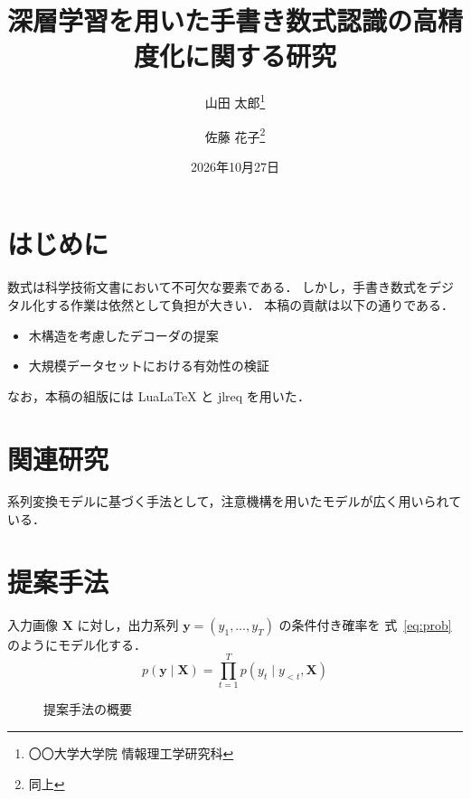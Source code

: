 \documentclass[paper=a4paper,fontsize=10pt,twocolumn]{jlreq}
\title{深層学習を用いた手書き数式認識の高精度化に関する研究}
\author{山田 太郎\thanks{〇〇大学大学院 情報理工学研究科} \and 佐藤 花子\thanks{同上}}
\date{2026年10月27日}
\begin{document}

\section{はじめに}
数式は科学技術文書において不可欠な要素である．
しかし，手書き数式をデジタル化する作業は依然として負担が大きい\cite{zhang2017}．
本稿の貢献は以下の通りである．
\begin{itemize}
  \item 木構造を考慮したデコーダの提案
  \item 大規模データセットにおける有効性の検証
\end{itemize}
なお，本稿の組版には LuaLaTeX と jlreq を用いた\cite{okumura2023}．

\section{関連研究}
系列変換モデルに基づく手法として，注意機構を用いたモデルが広く用いられている\cite{vaswani2017}．

\section{提案手法}
入力画像 $\mathbf{X}$ に対し，出力系列 $\mathbf{y} = (y_1, \dots, y_T)$ の条件付き確率を
式~\eqref{eq:prob} のようにモデル化する．
\begin{equation}
  p(\mathbf{y} \mid \mathbf{X}) = \prod_{t=1}^{T} p(y_t \mid y_{<t}, \mathbf{X})
  \label{eq:prob}
\end{equation}

\begin{figure}[tb]
  \centering
  \caption{提案手法の概要}
  \label{fig:overview}
\end{figure}
\end{document}
